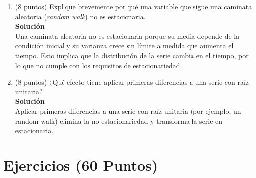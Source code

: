 \documentclass[10pt,a4paper]{article}
\begin{document}
\begin{enumerate}
En cambio, la \textit{alta multicolinealidad} ocurre cuando las variables explicativas están fuertemente correlacionadas, pero no de manera exacta. Aquí los estimadores de MCO sí pueden calcularse, pero presentan una varianza elevada, lo que se traduce en errores estándar grandes y dificulta la inferencia estadística, ya que los coeficientes pueden aparecer como no significativos aun cuando la variable sea relevante, y dificultando su interpretación.

\item (8 puntos) Explique brevemente por qué una variable que sigue una caminata aleatoria (\textit{random walk}) no es estacionaria.\\
\textbf{Solución}\\
Una caminata aleatoria no es estacionaria porque su media depende de la condición inicial y su varianza crece sin límite a medida que aumenta el tiempo. Esto implica que la distribución de la serie cambia en el tiempo, por lo que no cumple con los requisitos de estacionariedad.

\item (8 puntos) ¿Qué efecto tiene aplicar primeras diferencias a una serie con raíz unitaria?
\\
\textbf{Solución}
\\
Aplicar primeras diferencias a una serie con raíz unitaria (por ejemplo, un random walk) elimina la no estacionariedad y transforma la serie en estacionaria.

\end{enumerate}

\section{Ejercicios (60 Puntos)}
\end{document}
